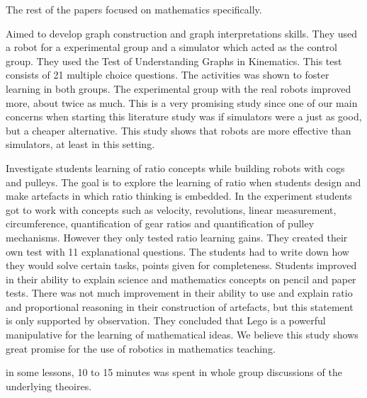 \bigskip\noindent
The rest of the papers focused on mathematics specifically\cite{mitnik2009collaborative, norton2004using, lindh2007does, silk2011resources}.

\bigskip\noindent
\cite{mitnik2009collaborative} Aimed to develop graph construction and graph interpretations skills. They used a robot for a experimental group and a simulator which acted as the control group. They used the Test of Understanding Graphs in Kinematics. This test consists of 21 multiple choice questions. The activities was shown to foster learning in both groups. The experimental group with the real robots improved more, about twice as much. This is a very promising study since one of our main concerns when starting this literature study was if simulators were a just as good, but a cheaper alternative. This study shows that robots are more effective than simulators, at least in this setting. 

\bigskip\noindent
\cite{norton2004using} Investigate students learning of ratio concepts while building robots with cogs and pulleys. The goal is to explore the learning of ratio when students design and make artefacts in which ratio thinking is embedded. In the experiment students got to work with concepts such as velocity, revolutions, linear measurement, circumference, quantification of gear ratios and quantification of pulley mechanisms. However they only tested ratio learning gains. They created their own test with 11 explanational questions. The students had to write down how they would solve certain tasks, points given for completeness. Students improved in their ability to explain science and mathematics concepts on pencil and paper tests. There was not much improvement in their ability to use and explain ratio and proportional reasoning in their construction of artefacts, but this statement is only supported by observation. They concluded that Lego is a powerful manipulative for the  learning of mathematical ideas. We believe this study shows great promise for the use of robotics in mathematics teaching.

\bigskip\noindent
\cite{norton2004using}in some lessons, 10 to 15 minutes was spent in whole group discussions of the underlying theoires. 

